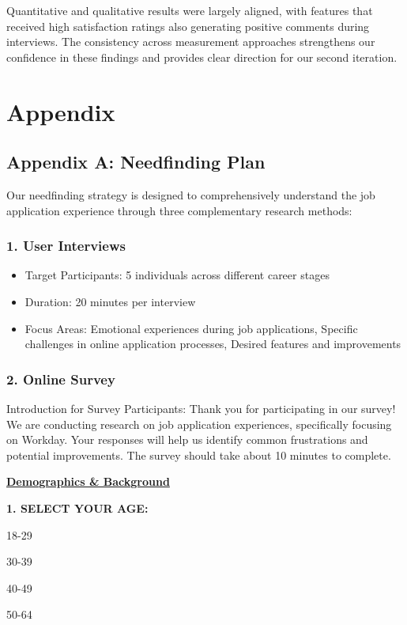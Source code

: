\documentclass[
	letterpaper, %
]{jdf}
\begin{document}
Quantitative and qualitative results were largely aligned, with features that received high satisfaction ratings also generating positive comments during interviews. The consistency across measurement approaches strengthens our confidence in these findings and provides clear direction for our second iteration.

\newpage
\section{Appendix}
\subsection{Appendix A: Needfinding Plan}

Our needfinding strategy is designed to comprehensively understand the job application experience through three complementary research methods:

\subsubsection{1. User Interviews}
\begin{itemize}
\item Target Participants: 5 individuals across different career stages
\item Duration: 20 minutes per interview
\item Focus Areas: Emotional experiences during job applications, Specific challenges in online application processes, Desired features and improvements
\end{itemize}
\hfill \break

\subsubsection{2. Online Survey}
Introduction for Survey Participants:
Thank you for participating in our survey! We are conducting research on job application experiences, specifically focusing on Workday. Your responses will help us identify common frustrations and potential improvements. The survey should take about 10 minutes to complete.

\underline{\textbf{Demographics \& Background}}

\textbf{1. SELECT YOUR AGE:}

18-29

30-39

40-49

50-64
\end{document}
